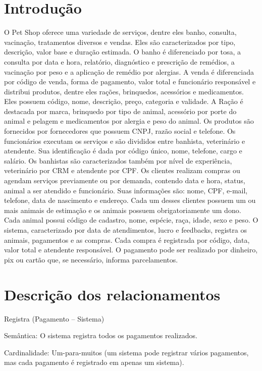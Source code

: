 \documentclass{article}
\begin{document}
\section{Introdução}
O Pet Shop oferece uma variedade de serviços, dentre eles banho, consulta, vacinação, tratamentos diversos e vendas. Eles são caracterizados por tipo, descrição, valor base e duração estimada. O banho é diferenciado por tosa, a consulta por data e hora, relatório, diagnóstico e prescrição de remédios, a vacinação por peso e a aplicação de remédio por alergias. A venda é diferenciada por código de venda, forma de pagamento, valor total e funcionário responsável e distribui produtos, dentre eles rações, brinquedos, acessórios e medicamentos. Eles possuem código, nome, descrição, preço, categoria e validade. A Ração é destacada por marca, brinquedo por tipo de animal, acessório por porte do animal e pelagem e medicamentos por alergia e peso do animal. Os produtos são fornecidos por fornecedores que possuem CNPJ, razão social e telefone. Os funcionários executam os serviços e são divididos entre banhista, veterinário e atendente. Sua identificação é dada por código único, nome, telefone, cargo e salário. Os banhistas são caracterizados também por nível de experiência, veterinário por CRM e atendente por CPF. Os clientes realizam compras ou agendam serviços previamente ou por demanda, contendo data e hora, status, animal a ser atendido e funcionário. Suas informações são: nome, CPF, e-mail, telefone, data de nascimento e endereço.  Cada um desses clientes possuem um ou mais animais de estimação e os animais possuem obrigatoriamente um dono. Cada animal possui código de cadastro, nome, espécie, raça, idade, sexo e peso. O sistema, caracterizado por data de atendimentos, lucro e feedbacks, registra os animais, pagamentos e as compras. Cada compra é registrada por código, data, valor total e atendente responsável. O pagamento pode ser realizado por dinheiro, pix ou cartão que, se necessário, informa parcelamentos.

\newpage

\section{Descrição dos relacionamentos}

Registra (Pagamento – Sistema) 

Semântica: O sistema registra todos os pagamentos realizados. 

Cardinalidade: Um-para-muitos (um sistema pode registrar vários pagamentos, mas cada pagamento é registrado em apenas um sistema). 
\end{document}
